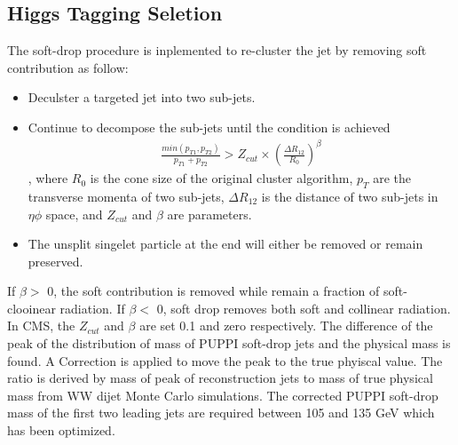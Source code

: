\subsection{Higgs Tagging Seletion} 

The soft-drop procedure is inplemented to re-cluster the jet by removing soft contribution as follow:
\begin{itemize}
\item Deculster a targeted jet into two sub-jets.
\item Continue to decompose the sub-jets until the condition is achieved
\begin{equation} \label{eq5}
\begin{split}
\frac{min(p_{T1},p_{T2})}{p_{T1}+p_{T2}} > Z_{cut} \times (\frac{\Delta R_{12}}{R_0})^{\beta}
\end{split}
\end{equation}
, where $R_0$ is the cone size of the original cluster algorithm, $p_T$ are the transverse momenta of two sub-jets, $\Delta R_{12}$ is the distance of two sub-jets in $\eta \phi$ space, and $Z_{cut}$ and $\beta $ are parameters. 
\item The unsplit singelet particle at the end will either be removed or remain preserved.
\end{itemize} 
If $\beta  >$ 0, the soft contribution is removed while remain a fraction of soft-clooinear radiation. 
If $\beta  <$ 0, soft drop removes both  soft and collinear radiation.
In CMS, the $Z_{cut}$ and $\beta $ are set 0.1 and zero respectively.
The difference of the peak of the distribution of mass of PUPPI soft-drop jets and the physical mass is found.
A Correction is applied to move the peak to the true phyiscal value. 
The ratio is derived by mass of peak of reconstruction jets to mass of true physical mass from WW dijet Monte Carlo simulations.
The corrected PUPPI soft-drop mass of the first two leading jets are required between 105 and 135 GeV which has been optimized.
 
